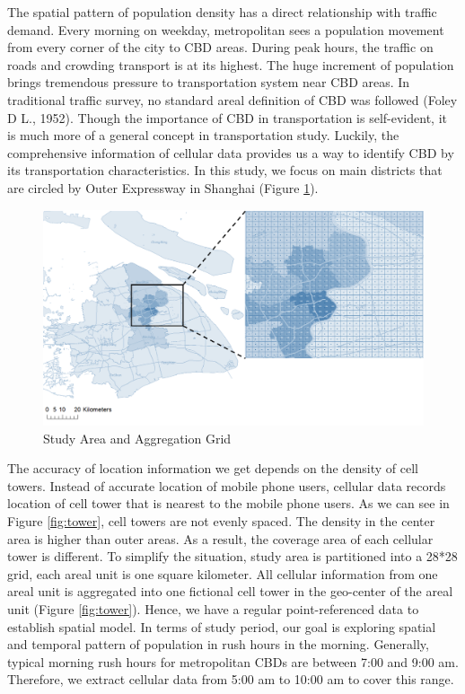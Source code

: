 \documentclass[hidelinks,12pt]{article}
\begin{document}
The spatial pattern of population density has a direct relationship with traffic demand.  Every morning on weekday, metropolitan sees a population movement from every corner of the city to CBD areas. During peak hours, the traffic on roads and crowding transport is at its highest. The huge increment of population brings tremendous pressure to transportation system near CBD areas. In traditional traffic survey, no standard areal definition of CBD was followed (Foley D L., 1952). Though the importance of CBD in transportation is self-evident, it is much more of a general concept in transportation study. Luckily, the comprehensive information of cellular data provides us a way to identify CBD by its transportation characteristics. In this study, we focus on main districts that are circled by Outer Expressway in Shanghai (Figure \ref{fig:area}).
	\begin{figure}[!ht]
		\includegraphics[width=\textwidth]{area.png}
		\caption{Study Area and Aggregation Grid \label{fig:area}}
	\end{figure}
\FloatBarrier
	The accuracy of location information we get depends on the density of cell towers. Instead of accurate location of mobile phone users, cellular data records location of cell tower that is nearest to the mobile phone users. As we can see in Figure \ref{fig:tower}, cell towers are not evenly spaced. The density in the center area is higher than outer areas. As a result, the coverage area of each cellular tower is different. To simplify the situation, study area is partitioned into a 28*28 grid, each areal unit is one square kilometer. All cellular information from one areal unit is aggregated into one fictional cell tower in the geo-center of the areal unit (Figure \ref{fig:tower}). Hence, we have a regular point-referenced data to establish spatial model. In terms of study period, our goal is exploring spatial and temporal pattern of population in rush hours in the morning. Generally, typical morning rush hours for metropolitan CBDs are between 7:00 and 9:00 am. Therefore, we extract cellular data from 5:00 am to 10:00 am to cover this range.
\end{document}
